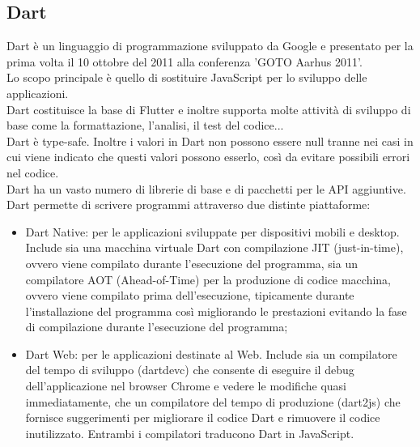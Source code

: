\subsection{Dart}
\label{sec:Dart}
Dart \cite{dart,dartstoria} è un linguaggio di programmazione sviluppato da Google e presentato per la prima volta il 10 ottobre del 2011 alla conferenza 'GOTO Aarhus 2011'.\\
Lo scopo principale è quello di sostituire JavaScript per lo sviluppo delle applicazioni.\\
Dart costituisce la base di Flutter e inoltre supporta molte attività di sviluppo di base come la formattazione, l'analisi, il test del codice...\\
Dart è type-safe. Inoltre i valori in Dart non possono essere null tranne nei casi in cui viene indicato che questi valori possono esserlo, così da evitare possibili errori nel codice.\\
Dart ha un vasto numero di librerie di base e di pacchetti per le API aggiuntive.\\
Dart permette di scrivere programmi attraverso due distinte piattaforme:
\begin{itemize}
	\item Dart Native: per le applicazioni sviluppate per dispositivi mobili e desktop. Include sia una macchina virtuale Dart con compilazione JIT (just-in-time), ovvero viene compilato durante l'esecuzione del programma, sia un compilatore AOT (Ahead-of-Time) per la produzione di codice macchina, ovvero  viene compilato prima dell'esecuzione, tipicamente durante l'installazione del programma così migliorando le prestazioni evitando la fase di compilazione durante l'esecuzione del programma;  
	\item Dart Web: per le applicazioni destinate al Web. Include sia un compilatore del tempo di sviluppo (dartdevc) che consente di eseguire il debug dell'applicazione nel browser Chrome e vedere le modifiche quasi immediatamente, che un compilatore del tempo di produzione (dart2js) che fornisce suggerimenti per migliorare il codice Dart e rimuovere il codice inutilizzato. Entrambi i compilatori traducono Dart in JavaScript.\\
\end{itemize}

